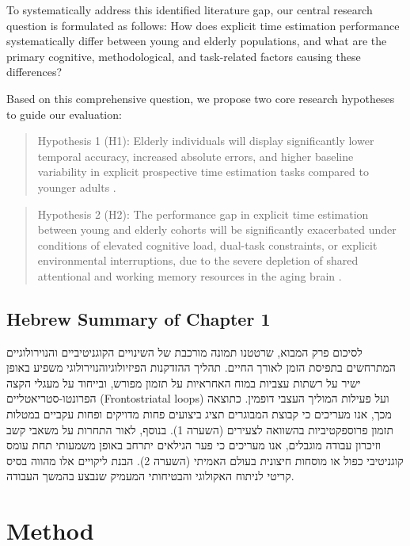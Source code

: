 \documentclass{custom_report}
\begin{document}
To systematically address this identified literature gap, our central research question is formulated as follows: How does explicit time estimation performance systematically differ between young and elderly populations, and what are the primary cognitive, methodological, and task-related factors causing these differences?

Based on this comprehensive question, we propose two core research hypotheses to guide our evaluation:
\begin{quote}
    Hypothesis 1 (H1): Elderly individuals will display significantly lower temporal accuracy, increased absolute errors, and higher baseline variability in explicit prospective time estimation tasks compared to younger adults \cite{Block1998}.
\end{quote}
\begin{quote}
    Hypothesis 2 (H2): The performance gap in explicit time estimation between young and elderly cohorts will be significantly exacerbated under conditions of elevated cognitive load, dual-task constraints, or explicit environmental interruptions, due to the severe depletion of shared attentional and working memory resources in the aging brain \cite{Lustig2001, Bherer2007}.
\end{quote}

\section{Hebrew Summary of Chapter 1}
לסיכום פרק המבוא, שרטטנו תמונה מורכבת של השינויים הקוגניטיביים והנוירולוגיים המתרחשים בתפיסת הזמן לאורך החיים. תהליך ההזדקנות הפיזיולוגיוהנוירולוגי משפיע באופן ישיר על רשתות עצביות במוח האחראיות על תזמון מפורש, ובייחוד על מעגלי הקצה הפרונטו-סטריאטליים (Frontostriatal loops) ועל פעילות המוליך העצבי דופמין. כתוצאה מכך, אנו מעריכים כי קבוצת המבוגרים תציג ביצועים פחות מדויקים ופחות עקביים במטלות תזמון פרוספקטיביות בהשוואה לצעירים (השערה 1). בנוסף, לאור התחרות על משאבי קשב וזיכרון עבודה מוגבלים, אנו מעריכים כי פער הגילאים יתרחב באופן משמעותי תחת עומס קוגניטיבי כפול או מוסחות חיצונית בעולם האמיתי (השערה 2). הבנת ליקויים אלו מהווה בסיס קריטי לניתוח האקולוגי והבטיחותי המעמיק שנבצע בהמשך העבודה.

\clearpage

\chapter{Method}
\label{ch:method}
\end{document}
